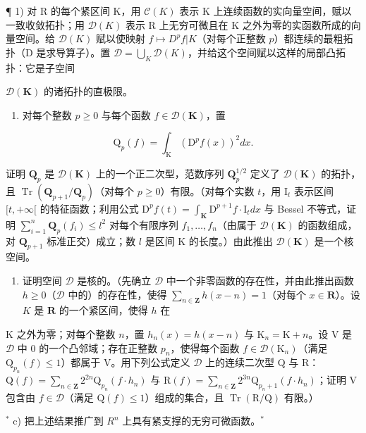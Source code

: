 \exercisesection{}

¶ 1) 对 R 的每个紧区间 K，用 \(\mathcal{C}(K)\) 表示 K 上连续函数的实向量空间，赋以一致收敛拓扑；用 \(\mathcal{D}(K)\) 表示 R 上无穷可微且在 K 之外为零的实函数所成的向量空间。给 \(\mathcal{D}(K)\) 赋以使映射 \(f \mapsto D^{p}f|K\)（对每个正整数 \(p\)）都连续的最粗拓扑（D 是求导算子）。置 \(\mathcal{D} = \bigcup_{K} \mathcal{D}(K)\)，并给这个空间赋以这样的局部凸拓扑：它是子空间

\(\mathcal{D}(\mathbf{K})\) 的诸拓扑的直极限。

\begin{enumerate}
\def\labelenumi{\alph{enumi})}
\tightlist
\item
  对每个整数 \(p \geqslant 0\) 与每个函数 \(f \in \mathcal{D}(\mathbf{K})\)，置
\end{enumerate}

\[
\mathrm{Q} _ {p} (f) = \int_ {\mathrm{K}} \left(\mathrm{D} ^ {p} f (x)\right) ^ {2} d x.
\]

证明 \(\mathbf{Q}_p\) 是 \(\mathcal{D}(\mathbf{K})\) 上的一个正二次型，范数序列 \(\mathbf{Q}_p^{1/2}\) 定义了 \(\mathcal{D}(\mathbf{K})\) 的拓扑，且 \(\operatorname{Tr}(\mathbf{Q}_{p+1}/\mathbf{Q}_p)\)（对每个 \(p \geqslant 0\)）有限。（对每个实数 \(t\)，用 \(\mathrm{I}_t\) 表示区间 \([t, +\infty[\) 的特征函数；利用公式 \(\mathrm{D}^p f(t) = \int_{\mathbf{K}} \mathrm{D}^{p+1} f \cdot \mathrm{I}_t dx\) 与 Bessel 不等式，证明 \(\sum_{i=1}^{n} \mathbf{Q}_p(f_i) \leqslant l^2\) 对每个有限序列 \(f_1, \ldots, f_n\)（由属于 \(\mathcal{D}(\mathbf{K})\) 的函数组成，对 \(\mathbf{Q}_{p+1}\) 标准正交）成立；数 \(l\) 是区间 K 的长度。）由此推出 \(\mathcal{D}(\mathbf{K})\) 是一个核空间。

\begin{enumerate}
\def\labelenumi{\alph{enumi})}
\setcounter{enumi}{1}
\tightlist
\item
  证明空间 \(\mathcal{D}\) 是核的。（先确立 \(\mathcal{D}\) 中一个非零函数的存在性，并由此推出函数 \(h \geqslant 0\)（\(\mathcal{D}\) 中的）的存在性，使得 \(\sum_{n \in \mathbf{Z}} h(x - n) = 1\)（对每个 \(x \in \mathbf{R}\)）。设 \(K\) 是 \(\mathbf{R}\) 的一个紧区间，使得 \(h\) 在
\end{enumerate}

K 之外为零；对每个整数 \(n\)，置 \(h_n(x) = h(x - n)\) 与 \(\mathrm{K}_n = \mathrm{K} + n\)。设 V 是 \(\mathcal{D}\) 中 0 的一个凸邻域；存在正整数 \(p_n\)，使得每个函数 \(f \in \mathcal{D}(\mathrm{K}_n)\)（满足 \(\mathrm{Q}_{p_n}(f) \leqslant 1\)）都属于 V。用下列公式定义 \(\mathcal{D}\) 上的连续二次型 Q 与 R：\(\mathrm{Q}(f) = \sum_{n \in \mathbf{Z}} 2^{2n} \mathrm{Q}_{p_n}(f \cdot h_n)\) 与 \(\mathrm{R}(f) = \sum_{n \in \mathbf{Z}} 2^{3n} \mathrm{Q}_{p_n + 1}(f \cdot h_n)\)；证明 V 包含由 \(f \in \mathcal{D}\)（满足 \(\mathrm{Q}(f) \leqslant 1\)）组成的集合，且 \(\operatorname{Tr}(\mathrm{R}/\mathrm{Q})\) 有限。）

\(^{*}\) c) 把上述结果推广到 \(R^{n}\) 上具有紧支撑的无穷可微函数。\(^{*}\)

